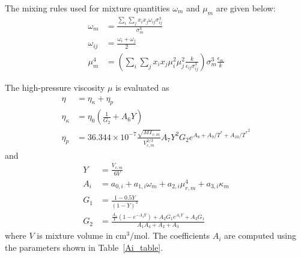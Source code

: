 The mixing rules used for mixture quantities $\omega_m$ and $\mu_m$ are given below:
\begin{align}
    \omega_m &= \frac{\sum_i\sum_j x_ix_j \omega_{ij}\sigma_{ij}^3}{\sigma_m^3}\\
    \omega_{ij} &= \frac{\omega_i+\omega_j}{2}\\
    \mu_m^4 &= \left(\sum_i\sum_j x_i x_j \mu_{i}^2 \mu_{j}^2  \frac{k}{\epsilon_{ij}\sigma_{ij}^3}\right) \sigma_m^3\frac{\epsilon_m}{k}
\end{align}

The high-pressure viscosity $\mu$ is evaluated as
\begin{align}
\eta &= \eta_{\kappa} +\eta_p \\
\eta_{\kappa} &= \eta_0 \left( \frac{1}{G_2}+A_6 Y \right) \\
\eta_p &= 36.344\times 10^{-7}\frac{\sqrt{M T_{c,m}}}{V_{c,m}^{2/3}}A_7Y^2G_2 e^{A_8+A_9/T^*+A_{10}/{T^*}^2}
\end{align}
and 
\begin{align}
    Y &= \frac{V_{c,m}}{6V} \\
    A_{i} &= a_{0,i} + a_{1,i}\omega_m + a_{2,i} \mu_{r,m}^4 + a_{3,i} \kappa_m\\
    G_1 &= \frac{1-0.5 Y }{(1-Y)^3} \\
    G_2 &=\frac{ \frac{A_1}{Y} \left(1- e^{-A_4 Y}\right)+ A_2 G_1 e^{A_5 Y}+A_3 G_1 }{A_1A_4+A_2+A_3} 
\end{align}
where $V$ is mixture volume in $\text{cm}^3/\text{mol}$. The coefficients $A_i$ are
computed using the parameters shown in Table~\ref{Ai_table}.


